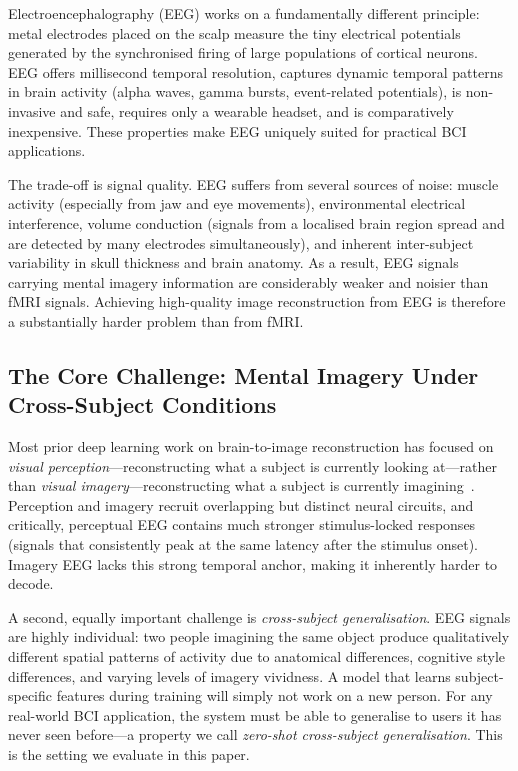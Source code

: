 \documentclass{article}
\begin{document}
Electroencephalography (EEG) works on a fundamentally different principle: metal electrodes placed on the scalp measure the tiny electrical potentials generated by the synchronised firing of large populations of cortical neurons. EEG offers millisecond temporal resolution, captures dynamic temporal patterns in brain activity (alpha waves, gamma bursts, event-related potentials), is non-invasive and safe, requires only a wearable headset, and is comparatively inexpensive. These properties make EEG uniquely suited for practical BCI applications.

The trade-off is signal quality. EEG suffers from several sources of noise: muscle activity (especially from jaw and eye movements), environmental electrical interference, volume conduction (signals from a localised brain region spread and are detected by many electrodes simultaneously), and inherent inter-subject variability in skull thickness and brain anatomy. As a result, EEG signals carrying mental imagery information are considerably weaker and noisier than fMRI signals. Achieving high-quality image reconstruction from EEG is therefore a substantially harder problem than from fMRI.

\subsection{The Core Challenge: Mental Imagery Under Cross-Subject Conditions}

Most prior deep learning work on brain-to-image reconstruction has focused on \emph{visual perception}---reconstructing what a subject is currently looking at---rather than \emph{visual imagery}---reconstructing what a subject is currently imagining~\citep{ozcelik2023brain,scotti2024mindeye}. Perception and imagery recruit overlapping but distinct neural circuits, and critically, perceptual EEG contains much stronger stimulus-locked responses (signals that consistently peak at the same latency after the stimulus onset). Imagery EEG lacks this strong temporal anchor, making it inherently harder to decode.

A second, equally important challenge is \emph{cross-subject generalisation}. EEG signals are highly individual: two people imagining the same object produce qualitatively different spatial patterns of activity due to anatomical differences, cognitive style differences, and varying levels of imagery vividness. A model that learns subject-specific features during training will simply not work on a new person. For any real-world BCI application, the system must be able to generalise to users it has never seen before---a property we call \emph{zero-shot cross-subject generalisation}. This is the setting we evaluate in this paper.
\end{document}
